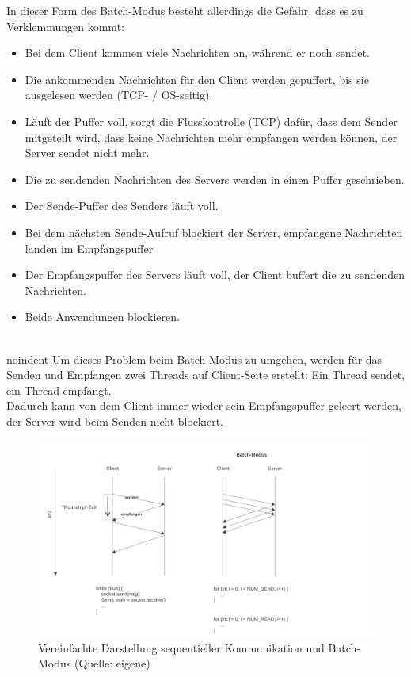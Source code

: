 \noindent
In dieser Form des Batch-Modus besteht allerdings die Gefahr, dass es zu Verklemmungen kommt:
\begin{itemize}
    \item Bei dem Client kommen viele Nachrichten an, während er noch sendet.
    \item Die ankommenden Nachrichten für den Client werden gepuffert, bis sie ausgelesen werden (TCP- / OS-seitig).
    \item Läuft der Puffer voll, sorgt die Flusskontrolle (TCP) dafür, dass dem Sender mitgeteilt wird, dass keine Nachrichten mehr empfangen werden können, der Server sendet nicht mehr.
    \item Die zu sendenden Nachrichten des Servers werden in einen Puffer geschrieben.
    \item Der Sende-Puffer des Senders läuft voll.
    \item Bei dem nächsten Sende-Aufruf blockiert der Server, empfangene Nachrichten landen im Empfangspuffer
    \item Der Empfangspuffer des Servers läuft voll, der Client buffert die zu sendenden Nachrichten.
    \item Beide Anwendungen blockieren.
\end{itemize}

\\noindent
Um dieses Problem beim Batch-Modus zu umgehen, werden für das Senden und Empfangen zwei Threads auf Client-Seite erstellt: Ein Thread sendet, ein Thread empfängt. \\
Dadurch kann von dem Client immer wieder sein Empfangspuffer geleert werden, der Server wird beim Senden nicht blockiert.

\begin{figure}
    \centering
    \includegraphics[scale=0.4]{chapters/Anhang/Klausuren/img/batchmodus}
    \caption{Vereinfachte Darstellung sequentieller Kommunikation und Batch-Modus (Quelle: eigene)}
    \label{fig:batchmodus}
\end{figure}